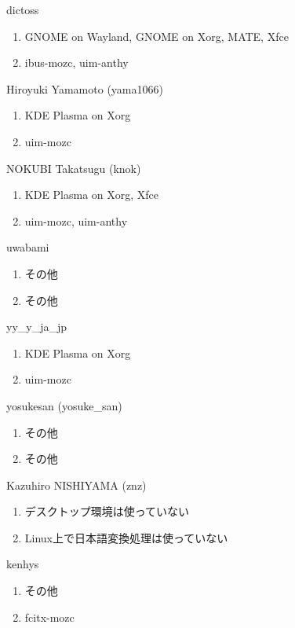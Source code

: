 \begin{prework}{ dictoss }
  \begin{enumerate}
  \item GNOME on Wayland, GNOME on Xorg, MATE, Xfce
  \item ibus-mozc, uim-anthy
  \end{enumerate}
\end{prework}

\begin{prework}{ Hiroyuki Yamamoto (yama1066) }
  \begin{enumerate}
  \item KDE Plasma on Xorg
  \item uim-mozc
  \end{enumerate}
\end{prework}

\begin{prework}{ NOKUBI Takatsugu (knok) }
  \begin{enumerate}
  \item KDE Plasma on Xorg, Xfce
  \item uim-mozc, uim-anthy
  \end{enumerate}
\end{prework}

\begin{prework}{ uwabami }
  \begin{enumerate}
  \item その他
  \item その他
  \end{enumerate}
\end{prework}

\begin{prework}{ yy\_y\_ja\_jp }
  \begin{enumerate}
  \item KDE Plasma on Xorg
  \item uim-mozc
  \end{enumerate}
\end{prework}

\begin{prework}{ yosukesan (yosuke\_san) }
  \begin{enumerate}
  \item その他
  \item その他
  \end{enumerate}
\end{prework}

\begin{prework}{ Kazuhiro NISHIYAMA (znz) }
  \begin{enumerate}
  \item デスクトップ環境は使っていない
  \item Linux上で日本語変換処理は使っていない
  \end{enumerate}
\end{prework}

\begin{prework}{ kenhys }
  \begin{enumerate}
  \item その他
  \item fcitx-mozc
  \end{enumerate}
\end{prework}
